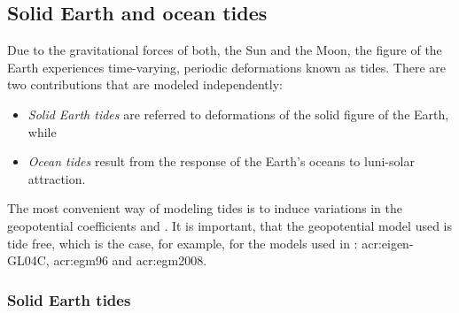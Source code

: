 %
\subsection{Solid Earth and ocean tides}
\label{sec:propagation-state-tides}
%

Due to the gravitational forces of both, the Sun and the Moon, the figure of the Earth experiences time-varying, periodic deformations known as tides. There are two
contributions that are modeled independently:
\begin{itemize}
 \item \textit{Solid Earth tides} are referred to deformations of the solid figure of the Earth, while
 \item \textit{Ocean tides} result from the response of the Earth's oceans to luni-solar attraction.
\end{itemize}
The most convenient way of modeling tides is to induce variations in the geopotential coefficients \cnm{}{} and \snm{}{} \citep{luzum2010}. It is important, that the
geopotential model used is tide free, which is the case, for example, for the models used in \neptune: \acrshort{acr:eigen}-GL04C, \acrshort{acr:egm}96 and
\acrshort{acr:egm}2008. 

\subsubsection{Solid Earth tides}

